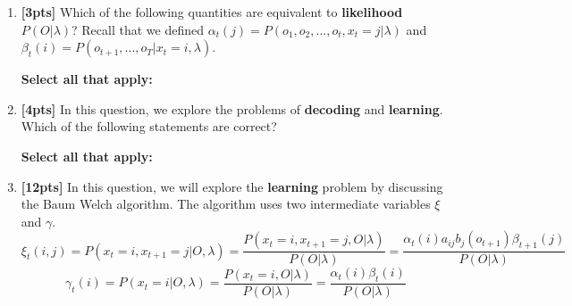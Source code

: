 \begin{enumerate}
    \item \textbf{[3pts]} Which of the following quantities are equivalent to \textbf{likelihood} $P(O|\lambda)$? Recall that we defined $\alpha_t(j)=P(o_1, o_2, ..., o_t, x_t=j|\lambda)$ and $\beta_t(i)=P(o_{t+1}, ..., o_T|x_t=i, \lambda)$. 
    
    \textbf{Select all that apply:}
    
    
    
    \item \textbf{[4pts]}  In this question, we explore the problems of \textbf{decoding} and \textbf{learning}. Which of the following statements are correct?
    
    \textbf{Select all that apply:}
    
    
    \item \textbf{[12pts]} In this question, we will explore the \textbf{learning} problem by discussing the Baum Welch algorithm. The algorithm uses two intermediate variables $\xi$ and $\gamma$. 
    $$\xi_t(i, j)=P(x_t=i, x_{t+1}=j|O, \lambda)=\frac{P(x_t=i, x_{t+1}=j, O|\lambda)}{P(O|\lambda)}=\frac{\alpha_t(i)a_{ij}b_j(o_{t+1})\beta_{t+1}(j)}{P(O|\lambda)}$$
    $$\gamma_t(i)=P(x_t=i|O, \lambda)=\frac{P(x_t=i, O|\lambda)}{P(O|\lambda)}=\frac{\alpha_t(i)\beta_t(i)}{P(O|\lambda)}$$
    

\end{enumerate}
